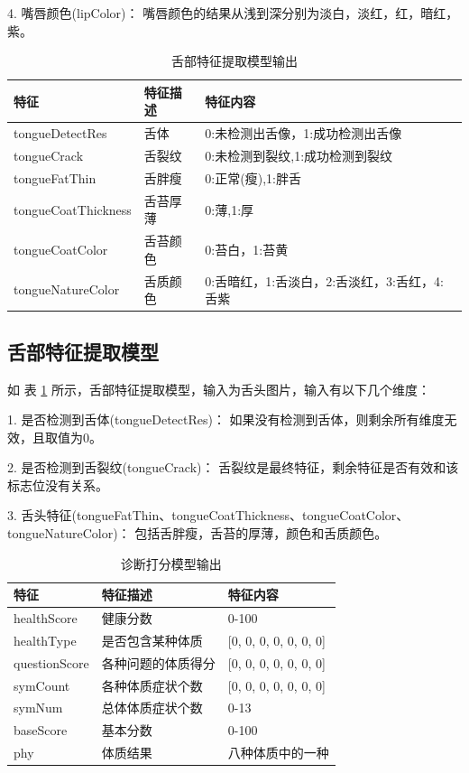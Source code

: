 4. 嘴唇颜色(lipColor)： 嘴唇颜色的结果从浅到深分别为淡白，淡红，红，暗红，紫。

\begin{table}[]
    \centering
    \begin{tabular}{lll}
        \toprule
        特征 & 特征描述 & 特征内容 \\ 
        \midrule
        tongueDetectRes & 舌体 & 0:未检测出舌像，1:成功检测出舌像 \\
        tongueCrack & 舌裂纹 & 0:未检测到裂纹,1:成功检测到裂纹 \\ 
        tongueFatThin & 舌胖瘦 & 0:正常(瘦),1:胖舌 \\
        tongueCoatThickness & 舌苔厚薄 & 0:薄,1:厚 \\
        tongueCoatColor & 舌苔颜色 & 0:苔白，1:苔黄 \\
        tongueNatureColor & 舌质颜色 & 0:舌暗红，1:舌淡白，2:舌淡红，3:舌红，4:舌紫\\
        \bottomrule
    \end{tabular}

    \caption{舌部特征提取模型输出}
    \label{tab:tongue-feature}
\end{table}

\subsection{舌部特征提取模型}
如 表 \ref{tab:tongue-feature} 所示，舌部特征提取模型，输入为舌头图片，输入有以下几个维度：

1. 是否检测到舌体(tongueDetectRes)： 如果没有检测到舌体，则剩余所有维度无效，且取值为0。

2. 是否检测到舌裂纹(tongueCrack)： 舌裂纹是最终特征，剩余特征是否有效和该标志位没有关系。

3. 舌头特征(tongueFatThin、tongueCoatThickness、tongueCoatColor、tongueNatureColor)： 包括舌胖瘦，舌苔的厚薄，颜色和舌质颜色。

\begin{table}[]
    \begin{center}
        \begin{tabular}{lll}
            \toprule
            特征 & 特征描述 & 特征内容 \\ 
            \midrule
            healthScore & 健康分数 & 0-100 \\
            healthType & 是否包含某种体质 & {[}0, 0, 0, 0, 0, 0, 0{]} \\ 
            questionScore & 各种问题的体质得分 & {[}0, 0, 0, 0, 0, 0, 0{]} \\
            symCount & 各种体质症状个数 & {[}0, 0, 0, 0, 0, 0, 0{]} \\
            symNum & 总体体质症状个数 & 0-13 \\
            baseScore & 基本分数 & 0-100 \\
            phy & 体质结果 & 八种体质中的一种\\
            \bottomrule
        \end{tabular}
    \end{center}
    \caption{诊断打分模型输出}
    \label{tab:diag-feature}
\end{table}

